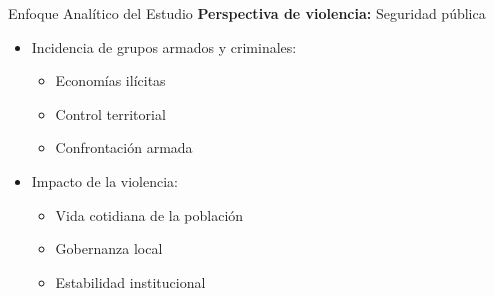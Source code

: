 \begin{frame}{Enfoque Analítico del Estudio}
    \vspace{0.4cm}
\textbf{Perspectiva de violencia:} \alert{Seguridad pública}
        \pause
        \vspace{0.2cm}
        \begin{itemize}
            \item Incidencia de \alert{grupos armados} y \alert{criminales}:
            \begin{itemize}
                \item Economías ilícitas
                \item Control territorial
                \item Confrontación armada
            \end{itemize}
            
            \vspace{0.4cm}
            \pause
            \item Impacto de la violencia: 
            \begin{itemize}
                \item Vida cotidiana de la población
                \item Gobernanza local 
                \item Estabilidad institucional
            \end{itemize}
        \end{itemize}

\end{frame}